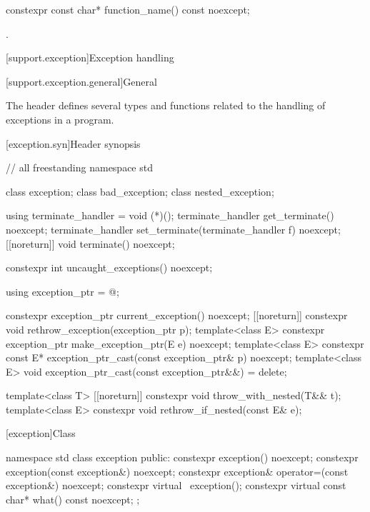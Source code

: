 \begin{itemdecl}
constexpr const char* function_name() const noexcept;
\end{itemdecl}
\begin{itemdescr}
\pnum
\returns
{}.
\end{itemdescr}

[support.exception]{Exception handling}

[support.exception.general]{General}

\pnum
The header 
defines several types and functions related to the handling of exceptions in a \Cpp{} program.

[exception.syn]{Header  synopsis}

\begin{codeblock}
// all freestanding
namespace std {
  class exception;
  class bad_exception;
  class nested_exception;

  using terminate_handler = void (*)();
  terminate_handler get_terminate() noexcept;
  terminate_handler set_terminate(terminate_handler f) noexcept;
  [[noreturn]] void terminate() noexcept;

  constexpr int uncaught_exceptions() noexcept;

  using exception_ptr = @\unspec@;

  constexpr exception_ptr current_exception() noexcept;
  [[noreturn]] constexpr void rethrow_exception(exception_ptr p);
  template<class E> constexpr exception_ptr make_exception_ptr(E e) noexcept;
  template<class E> constexpr const E* exception_ptr_cast(const exception_ptr& p) noexcept;
  template<class E> void exception_ptr_cast(const exception_ptr&&) = delete;

  template<class T> [[noreturn]] constexpr void throw_with_nested(T&& t);
  template<class E> constexpr void rethrow_if_nested(const E& e);
}
\end{codeblock}

[exception]{Class }

%
%
\begin{codeblock}
namespace std {
  class exception {
  public:
    constexpr exception() noexcept;
    constexpr exception(const exception&) noexcept;
    constexpr exception& operator=(const exception&) noexcept;
    constexpr virtual ~exception();
    constexpr virtual const char* what() const noexcept;
  };
}
\end{codeblock}

